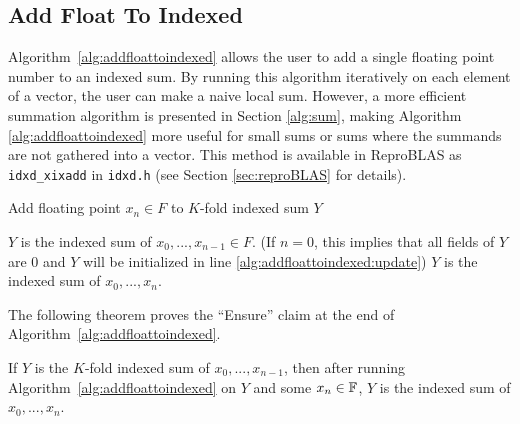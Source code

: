 \subsection{Add Float To Indexed}
  \label{sec:primitiveops_addfloattoindexed}
  Algorithm~\ref{alg:addfloattoindexed} allows the user to add a single floating
  point number to an indexed sum. By running this algorithm iteratively on each
  element of a vector, the user can make a naive local sum. However, a more
  efficient summation algorithm is presented in Section \ref{alg:sum}, making Algorithm \ref{alg:addfloattoindexed} more useful for small sums or sums where the summands are not gathered into a vector.
  This method is available in ReproBLAS as \texttt{idxd\_xixadd} in \texttt{idxd.h} (see Section \ref{sec:reproBLAS} for details).

  \begin{alg}
    Add floating point $x_n \in F$ to $K$-fold indexed sum $Y$
    \label{alg:addfloattoindexed}
    \begin{algorithmic}[1]
      \Require
        $Y$ is the indexed sum of $x_0, ..., x_{n - 1} \in F$. (If $n = 0$, this implies that all fields of $Y$ are 0 and $Y$ will be initialized in line \ref{alg:addfloattoindexed:update})
        \State {} \label{alg:addfloattoindexed:update}
        \State {}
        \State {}
      \EndFunction
      \Ensure
        $Y$ is the indexed sum of $x_0, ..., x_{n}$.
    \end{algorithmic}
  \end{alg}

  The following theorem proves the ``Ensure'' claim at the end of Algorithm~\ref{alg:addfloattoindexed}.
  \begin{thm}
    If $Y$ is the $K$-fold indexed sum of $x_0, ..., x_{n - 1}$, then after
    running Algorithm~\ref{alg:addfloattoindexed} on $Y$ and some $x_n \in \mathbb{F}$,
    $Y$ is the indexed sum of $x_0, ..., x_n$.
    \label{thm:addfloattoindexed}
  \end{thm}

